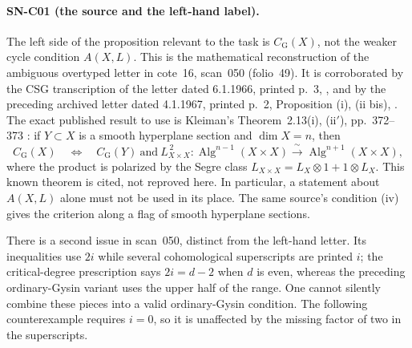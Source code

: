 \documentclass[11pt,a4paper]{article}
\theoremstyle{definition}
\theoremstyle{remark}
\begin{document}
\paragraph{SN-C01 (the source and the left-hand label).}
The left side of the proposition relevant to the task is
$C_{\mathrm G}(X)$, not the weaker cycle condition $A(X,L)$.
This is the mathematical reconstruction of the ambiguous overtyped
letter in cote~16, scan~050 (folio~49).  It is corroborated by the
CSG transcription of the letter dated 6.1.1966, printed p.~3,
\cite{GrothCoates1966}, and by the preceding archived letter dated 4.1.1967,
printed p.~2, Proposition (i), (ii bis), \cite{GrothCoates1967}.
The exact published result to use is Kleiman's Theorem~2.13(i),
(ii$'$), pp.~372--373 \cite{Kleiman1968}: if $Y\subset X$ is a
smooth hyperplane section and $\dim X=n$, then
\begin{equation}
 C_{\mathrm G}(X)\quad\Longleftrightarrow\quad
 C_{\mathrm G}(Y)\ \text{and}\
 L_{X\times X}^{\,2}:
 \operatorname{Alg}^{n-1}(X\times X)
 \xrightarrow{\ \sim\ }
 \operatorname{Alg}^{n+1}(X\times X),
 \label{eq:kleiman-critical}
\end{equation}
where the product is polarized by the Segre class
$L_{X\times X}=L_X\otimes1+1\otimes L_X$.
This known theorem is cited, not reproved here.  In particular,
a statement about $A(X,L)$ alone must not be used in its place.
The same source's condition (iv) gives the criterion along a flag
of smooth hyperplane sections.

There is a second issue in scan~050, distinct from the left-hand letter.
Its inequalities use $2i$ while several cohomological superscripts
are printed $i$; the critical-degree prescription says $2i=d-2$
when $d$ is even, whereas the preceding ordinary-Gysin variant uses
the upper half of the range.  One cannot silently combine these
pieces into a valid ordinary-Gysin condition.  The following
counterexample requires $i=0$, so it is unaffected by the missing
factor of two in the superscripts.
\end{document}
